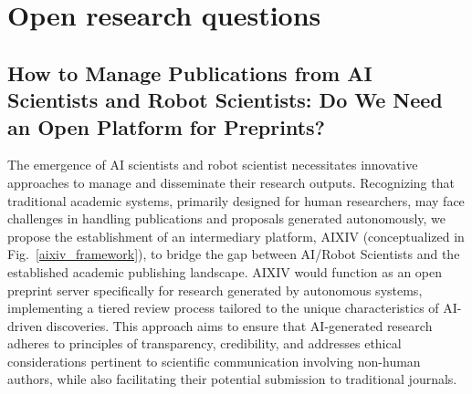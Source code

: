 \section*{Open research questions}

\subsection*{How to Manage Publications from AI Scientists and Robot Scientists: Do We Need an Open Platform for Preprints?}  

The emergence of AI scientists and robot scientist necessitates innovative approaches to manage and disseminate their research outputs. Recognizing that traditional academic systems, primarily designed for human researchers, may face challenges in handling publications and proposals generated autonomously, we propose the establishment of an intermediary platform, AIXIV (conceptualized in Fig.~\ref{aixiv_framework}), to bridge the gap between AI/Robot Scientists and the established academic publishing landscape. AIXIV would function as an open preprint server specifically for research generated by autonomous systems, implementing a tiered review process tailored to the unique characteristics of AI-driven discoveries. This approach aims to ensure that AI-generated research adheres to principles of transparency, credibility, and addresses ethical considerations pertinent to scientific communication involving non-human authors, while also facilitating their potential submission to traditional journals.



